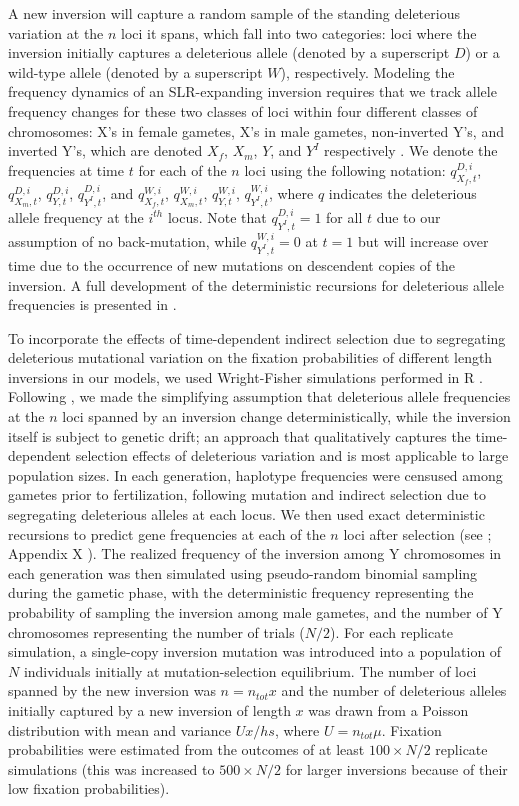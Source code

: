 \documentclass{article}[12pt]
\newcommand\hl[1]{%
  \bgroup
  \hskip0pt\color{blue!80!black}%
  #1%
  \egroup
}
\begin{document}
A new inversion will capture a random sample of the standing deleterious variation at the $n$ loci it spans, which fall into two categories: loci where the inversion initially captures a deleterious allele (denoted by a superscript $D$) or a wild-type allele (denoted by a superscript $W$), respectively. Modeling the frequency dynamics of an SLR-expanding inversion requires that we track allele frequency changes for these two classes of loci within four different classes of chromosomes: X's in female gametes, X's in male gametes, non-inverted Y's, and inverted Y's, which are denoted $X_f$, $X_m$, $Y$, and $Y^I$ respectively \citep[see][]{Otto2014,Olito-etal-2022}. We denote the frequencies at time $t$ for each of the $n$ loci using the following notation: $q_{X_f,t}^{D,i}$, $q_{X_m,t}^{D,i}$, $q_{Y,t}^{D,i}$, $q_{Y^I,t}^{D,i}$, and $q_{X_f,t}^{W,i}$, $q_{X_m,t}^{W,i}$, $q_{Y,t}^{W,i}$, $q_{Y^I,t}^{W,i}$, where $q$ indicates the deleterious allele frequency at the $i^{th}$ locus. Note that $q_{Y^I,t}^{D,i} = 1$ for all $t$ due to our assumption of no back-mutation, while $q_{Y^I,t}^{W,i} = 0$ at $t=1$ but will increase over time due to the occurrence of new mutations on descendent copies of the inversion. A full development of the deterministic recursions for deleterious allele frequencies is presented in \citep{Olito-etal-2022}. 

To incorporate the effects of time-dependent indirect selection due to segregating deleterious mutational variation on the fixation probabilities of different length inversions in our models, we used Wright-Fisher simulations performed in R \citep{RSoftware}. Following \citet{Olito-etal-2022}, we made the simplifying assumption that deleterious allele frequencies at the $n$ loci spanned by an inversion change deterministically, while the inversion itself is subject to genetic drift; an approach that qualitatively captures the time-dependent selection effects of deleterious variation and is most applicable to large population sizes. In each generation, haplotype frequencies were censused among gametes prior to fertilization, following mutation and indirect selection due to segregating deleterious alleles at each locus. We then used exact deterministic recursions to predict gene frequencies at each of the $n$ loci after selection (see \citealt{Olito-etal-2022}; Appendix \hl{X}). The realized frequency of the inversion among Y chromosomes in each generation was then simulated using pseudo-random binomial sampling during the gametic phase, with the deterministic frequency representing the probability of sampling the inversion among male gametes, and the number of Y chromosomes representing the number of trials ($N/2$). For each replicate simulation, a single-copy inversion mutation was introduced into a population of $N$ individuals initially at mutation-selection equilibrium. The number of loci spanned by the new inversion was $n = n_{tot} x$ and the number of deleterious alleles initially captured by a new inversion of length $x$ was drawn from a Poisson distribution with mean and variance $U x/hs$, where $U = n_{tot} \mu$. Fixation probabilities were estimated from the outcomes of at least $100 \times N/2$ replicate simulations (this was increased to $500 \times N/2$ for larger inversions because of their low fixation probabilities).
\end{document}
